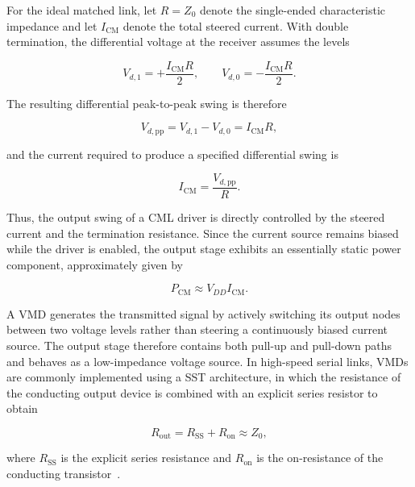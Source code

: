 For the ideal matched link, let $R=Z_0$ denote the single-ended characteristic impedance and let $I_{\mathrm{CM}}$ denote the total steered current. With double termination, the differential voltage at the receiver assumes the levels

\begin{equation}
    V_{d,1}=+\frac{I_{\mathrm{CM}}R}{2},
    \qquad
    V_{d,0}=-\frac{I_{\mathrm{CM}}R}{2}.
\end{equation}

The resulting differential peak-to-peak swing is therefore

\begin{equation}
    V_{d,\mathrm{pp}}
    =V_{d,1}-V_{d,0}
    =I_{\mathrm{CM}}R,
\end{equation}

and the current required to produce a specified differential swing is

\begin{equation}
    I_{\mathrm{CM}}
    =\frac{V_{d,\mathrm{pp}}}{R}.
    \label{eq:cm_driver_current}
\end{equation}

Thus, the output swing of a \ac{CML} driver is directly controlled by the steered current and the termination resistance. Since the current source remains biased while the driver is enabled, the output stage exhibits an essentially static power component, approximately given by

\begin{equation}
    P_{\mathrm{CM}}\approx V_{DD}I_{\mathrm{CM}}.
\end{equation}

A \ac{VMD} generates the transmitted signal by actively switching its output nodes between two voltage levels rather than steering a continuously biased current source. The output stage therefore contains both pull-up and pull-down paths and behaves as a low-impedance voltage source. In high-speed serial links, \acsp{VMD} are commonly implemented using a \ac{SST} architecture, in which the resistance of the conducting output device is combined with an explicit series resistor to obtain

\begin{equation}
    R_{\mathrm{out}}
    =R_{\mathrm{SS}}+R_{\mathrm{on}}
    \approx Z_0,
    \label{eq:vmd_output_impedance}
\end{equation}

where $R_{\mathrm{SS}}$ is the explicit series resistance and $R_{\mathrm{on}}$ is the on-resistance of the conducting transistor~\cite{xiong_vmd_2020,dally_poulton_1998}.

